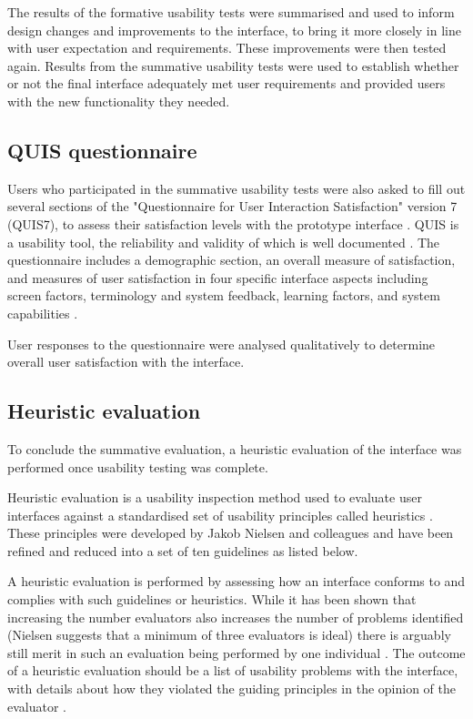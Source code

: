 The results of the formative usability tests were summarised and used to inform design changes and improvements to the interface, to bring it more closely in line with user expectation and requirements. These improvements were then tested again. Results from the summative usability tests were used to establish whether or not the final interface adequately met user requirements and provided users with the new functionality they needed.

\subsection{QUIS questionnaire}
Users who participated in the summative usability tests were also asked to fill out several sections of the "Questionnaire for User Interaction Satisfaction" version 7 (QUIS7), to assess their satisfaction levels with the prototype interface \citep{QUIS}. QUIS is a usability tool, the reliability and validity of which is well documented \citep{Harper1997}. The questionnaire includes a demographic section, an overall measure of satisfaction, and measures of user satisfaction in four specific interface aspects including screen factors, terminology and system feedback, learning factors, and system capabilities \citep{Harper1993}.  

User responses to the questionnaire were analysed qualitatively to determine overall user satisfaction with the interface. 

\subsection{Heuristic evaluation}
To conclude the summative evaluation, a heuristic evaluation of the interface was performed once usability testing was complete. 

Heuristic evaluation is a usability inspection method used to evaluate user interfaces against a standardised set of usability principles called heuristics \citep[p. 506]{RogersPreece}. These principles were developed by Jakob Nielsen and colleagues \citep{NielsenMolich} and have been refined and reduced into a set of ten guidelines as listed below. 

A heuristic evaluation is performed by assessing how an interface conforms to and complies with such guidelines or heuristics. While it has been shown that increasing the number evaluators also increases the number of problems identified (Nielsen suggests that a minimum of three evaluators is ideal) there is arguably still merit in such an evaluation being performed by one individual \citep{NielsenHow}. The outcome of a heuristic evaluation should be a list of usability problems with the interface, with details about how they violated the guiding principles in the opinion of the evaluator \citep{NielsenHow}. 

